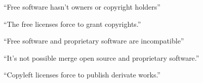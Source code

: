 
\begin{frame}

\begin{center}
\huge{``Free software hasn't owners or copyright holders''}
\end{center}

\end{frame}


\begin{frame}

\begin{center}
\huge{``The free licenses force to grant copyrights.''}
\end{center}

\end{frame}



\begin{frame}

\begin{center}
\huge{``Free software and proprietary software are incompatible''}
\end{center}

\end{frame}



\begin{frame}

\begin{center}
\huge{``It's not possible merge open source and proprietary software.''}
\end{center}

\end{frame}



\begin{frame}

\begin{center}
\huge{``Copyleft licenses force to publish derivate works.''}
\end{center}

\end{frame}



